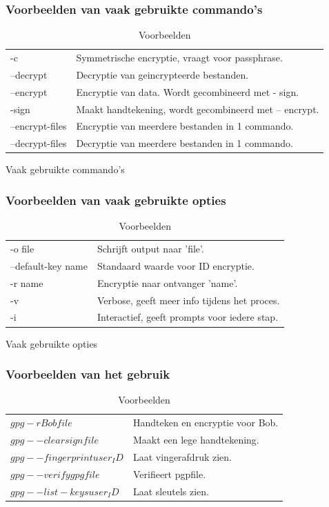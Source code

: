 \documentclass[12pt]{article}
\begin{document}
				\subsubsection{Voorbeelden van vaak gebruikte commando's}\label{com}
					\begin{table}[!ht] \cite{Commando}
						\begin{tabular}{l|l}
								-c				&	Symmetrische encryptie, vraagt voor 																	passphrase\index{Passphrase}.\\
								--decrypt			&	Decryptie\index{Decryptie} van geincrypteerde 															bestanden.\\
								--encrypt			&	Encryptie van data. Wordt gecombineerd met -															sign.\\
								-sign				&	Maakt handtekening, wordt gecombineerd met --															encrypt.\\
								--encrypt-files	&	Encryptie van meerdere bestanden in 1 																	commando.\\
								--decrypt-files	&	Decryptie van meerdere bestanden in 1 																	commando.\\
						\end{tabular}
						\caption{Vaak gebruikte commando's}						
					
				\subsubsection{Voorbeelden van vaak gebruikte opties}\label{opt}\cite{Commando}					
						\begin{tabular}{l|l}
								-o file				&	Schrijft output naar 'file'.\\
								--default-key name	&	Standaard waarde voor ID encryptie.\\
								-r name				&	Encryptie naar ontvanger 'name'.\\
								-v					&	Verbose\index{Verbose}, geeft meer info tijdens 														het proces.\\
								-i					&	Interactief, geeft prompts\index{Prompts} voor iedere 																	stap.\\
						\end{tabular}\caption{Vaak gebruikte opties}
											
				\subsubsection{Voorbeelden van het gebruik}\label{use}\cite{Commando}
						\begin{tabular}{l|l}
								$gpg -r Bob file$				&	Handteken en encryptie voor Bob.\\
								$gpg --clearsign file$			&	Maakt een lege 																							handtekening\index{Handtekening}.\\
								$gpg --fingerprint user_ID$		&	Laat vingerafdruk zien.\\
								$gpg --verify gpgfile$			&	Verifieert pgpfile.\\
								$gpg --list-keys user_ID$		&	Laat sleutels zien.\\
						\end{tabular}
						\caption{Voorbeelden}
					\end{table}	
\end{document}
